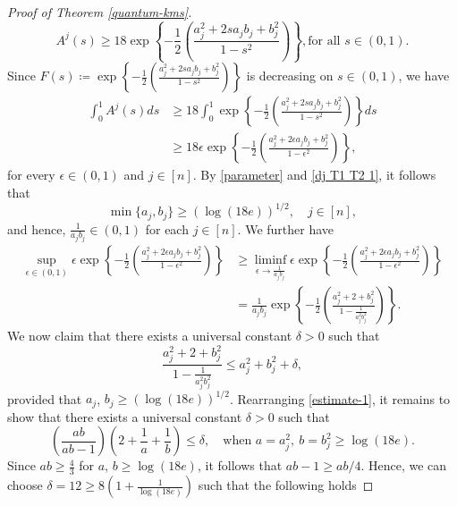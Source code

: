 \documentclass{amsbook}
\theoremstyle{definition}
\theoremstyle{remark}
\numberwithin{section}{chapter}
\numberwithin{equation}{chapter}
\newcommand{\1}{\mathbf{1}}
\begin{document}
\begin{proof}[Proof of Theorem \ref{quantum-kms}]
\begin{equation}
		A^{j}(s)\geq18 \exp\left\{-\frac{1}{2}\left(\frac{a^{2}_{j}+2sa_{j}b_{j}+b^{2}_{j}}{1-s^{2}}\right)\right\},\mbox{for all }s\in(0,1).
	\end{equation}
	Since $F(s)\coloneqq \exp\left\{-\frac{1}{2}\left(\frac{a^{2}_{j}+2sa_{j}b_{j}+b^{2}_{j}}{1-s^{2}}\right)\right\}$ is decreasing on $s\in(0,1)$, we have
	\begin{equation}\label{correlation-7}
    \begin{split}
		\int_0^1A^{j}(s) ds&\geq 18\int_{0}^{1}\exp\left\{-\frac{1}{2}\left(\frac{a^{2}_{j}+2sa_{j}b_{j}+b^{2}_{j}}{1-s^{2}}\right)\right\}ds\\
       &\geq18 \epsilon \exp\left\{-\frac{1}{2}\left(\frac{a^{2}_{j}+2\epsilon a_{j}b_{j}+b^{2}_{j}}{1-\epsilon^{2}}\right)\right\},
    \end{split}
	\end{equation}
	for every $\epsilon\in(0,1)$ and $j\in [n]$. By \eqref{parameter} and \eqref{dj T1 T2 1}, it follows that
	\[
	\min\{a_{j},b_{j}\}\geq (\log(18e))^{1/2},\quad j\in[n],
	\]
and hence, \(\frac{1}{a_jb_j}\in(0,1)\) for each $j\in [n]$. We further have	\begin{equation}\label{correlation-8}
		\begin{split}
			\sup_{\epsilon\in(0,1)}\epsilon \exp\left\{-\frac{1}{2}\left(\frac{a^{2}_{j}+2\epsilon a_{j}b_{j}+b^{2}_{j}}{1-\epsilon^{2}}\right)\right\}&\geq \liminf_{\epsilon\to \frac{1}{a_{j}b_{j}}}\epsilon \exp\left\{-\frac{1}{2}\left(\frac{a^{2}_{j}+2\epsilon a_{j}b_{j}+b^{2}_{j}}{1-\epsilon^{2}}\right)\right\}\\
			&=\frac{1}{a_{j}b_{j}}\exp\left\{-\frac{1}{2}\left(\frac{a^{2}_{j}+2+b^{2}_{j}}{1-\frac{1}{a^{2}_{j}b^{2}_{j}}}\right)\right\}.
		\end{split}
	\end{equation}
	We now claim that there exists a universal constant $\delta>0$ such that
	\begin{equation}\label{estimate-1}
		\frac{a^{2}_{j}+2+b^{2}_{j}}{1-\frac{1}{a^{2}_{j}b^{2}_{j}}}\leq a^{2}_{j}+b^{2}_{j}+\delta,
	\end{equation}
provided that $a_{j}$, $b_{j}\geq (\log(18e))^{1/2}$. Rearranging \eqref{estimate-1}, it remains to show that there exists a universal constant $\delta>0$ such that
	\begin{equation*}
		\left(\frac{ab}{ab-1}\right)\left(2+\frac{1}{a}+\frac{1}{b}\right)\leq \delta,\quad\mbox{when }a=a_{j}^2,~b=b_{j}^2\geq \log(18e).
	\end{equation*}
	Since $ab\geq \frac{4}{3}$ for $a$, $b\geq \log(18 e)$, it follows that $ab-1\geq ab/4$. Hence, we can choose $\delta=12\geq 8\left(1+\frac{1}{\log(18e)}\right)$ such that the following holds

\end{proof}
\end{document}
